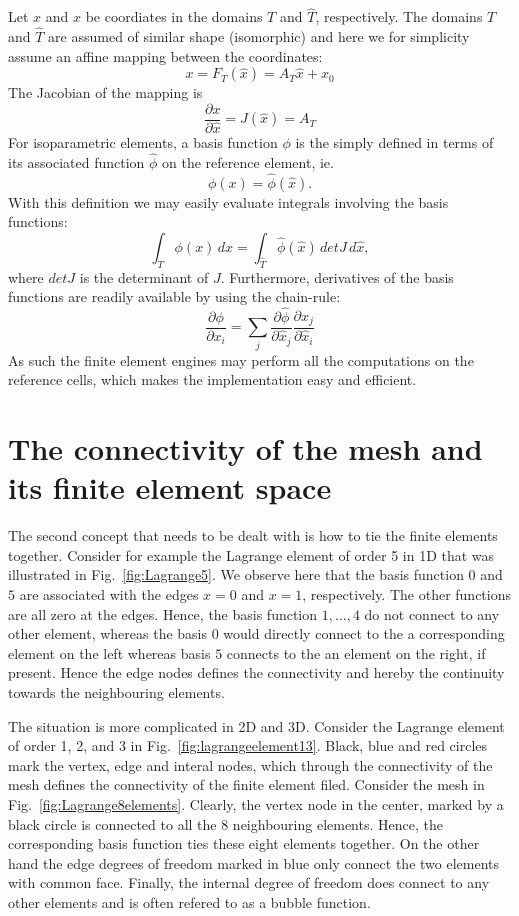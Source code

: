 Let $x$ and $\hat{x}$ be coordiates in the domains $T$ and $\hat{T}$, respectively. 
The domains $T$ and $\hat{T}$ are assumed of similar shape (isomorphic) 
and here we  
for simplicity assume an affine mapping between the coordinates:  
\[
x = F_T(\hat{x}) = A_T \hat{x} + x_0   
\]
The Jacobian of the mapping is 
\[
\frac{\partial x}{\partial \hat{x}} = J(\hat{x}) = A_T      
\]
For isoparametric elements, a basis function $\phi$
is the simply defined in terms of its associated function $\hat{\phi}$
on the reference
element, ie. 
\[
\phi(x) = \hat{\phi}(\hat{x}) .  
\]
With this definition we may easily evaluate integrals involving the basis functions: 
\[
\int_T \phi(x) \, dx = \int_{\hat{T}} \hat{\phi}(\hat{x}) \, det J \, d\hat{x},  
\]
where $det J$ is the determinant of $J$.  Furthermore, derivatives of the basis functions are readily available by using the chain-rule:  
\[
\frac{\partial \phi}{\partial x_i } = \sum_j  \frac{\partial \hat{\phi}}{\partial \hat{x}_j } \frac{\partial \hat{x}_j}{\partial \hat{x}_i } 
\]
As such the finite element engines may perform all the computations on the reference cells, which makes the implementation easy and efficient. 

\section{The connectivity of the mesh and its finite element space}

The second concept that needs to be dealt with is how to tie the finite elements together. 
Consider for example the Lagrange element of order 5 in 1D that was illustrated in Fig.~\ref{fig:Lagrange5}. We observe here that the basis function $0$ and $5$ are associated
with the edges $x=0$ and $x=1$, respectively. The other functions are all zero at the edges. Hence, the basis function $1, \ldots, 4$ do not connect 
to any other element, whereas the basis $0$ would directly connect to the a corresponding element on the left whereas basis $5$ connects to the 
an element on the right, if present. Hence the edge nodes defines the connectivity and hereby the continuity towards the neighbouring elements. 

The situation is more complicated in 2D and 3D. Consider the Lagrange element of order 1, 2, and 3 in Fig.~\ref{fig:lagrangeelement13}. Black, blue and red circles mark
the vertex, edge and interal nodes, which through the connectivity of the mesh defines the connectivity of the finite element filed. 
Consider the mesh in Fig.~\ref{fig:Lagrange8elements}. Clearly, the vertex node in the center, marked by a black circle is connected to all the 8 neighbouring elements. 
Hence, the corresponding basis function ties these eight elements together. On the other hand the edge degrees of freedom marked in 
blue only connect the two elements with common face. Finally, the internal degree of freedom does connect to any other elements and is often refered to as a bubble
function. 



